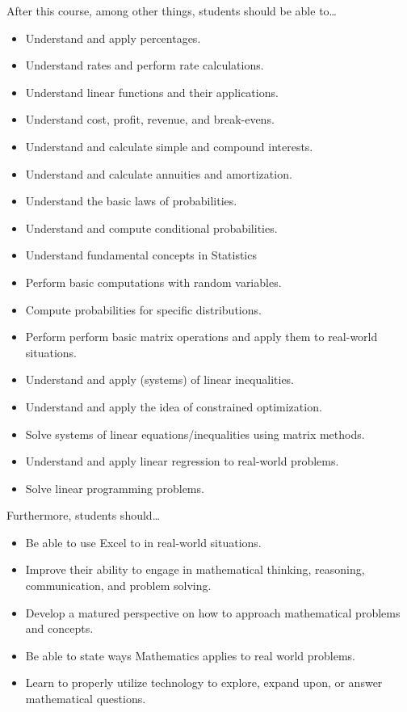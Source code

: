 \documentclass[11pt,letterpaper]{article}
\begin{document}
After this course, among other things, students should be able to\dots
	\begin{itemize} \itemsep=0.3ex
	\item Understand and apply percentages.
	\item Understand rates and perform rate calculations.
	\item Understand linear functions and their applications.
	\item Understand cost, profit, revenue, and break-evens. 
	\item Understand and calculate simple and compound interests.
	\item Understand and calculate annuities and amortization. 
	\item Understand the basic laws of probabilities. 
	\item Understand and compute conditional probabilities. 
	\item Understand fundamental concepts in Statistics
	\item Perform basic computations with random variables.  
	\item Compute probabilities for specific distributions.  
	\item Perform perform basic matrix operations and apply them to real-world situations.
	\item Understand and apply (systems) of linear inequalities. 
	\item Understand and apply the idea of constrained optimization. 	
	\item Solve systems of linear equations/inequalities using matrix methods.
	\item Understand and apply linear regression to real-world problems.
	\item Solve linear programming problems. 
	\end{itemize}
Furthermore, students should\dots
	\begin{itemize} \itemsep=0.3ex
	\item Be able to use Excel to in real-world situations. 
	\item  Improve their ability to engage in mathematical thinking, reasoning, communication, and problem solving.
	\item Develop a matured perspective on how to approach mathematical problems and concepts.
	\item Be able to state ways Mathematics applies to real world problems.
	\item Learn to properly utilize technology to explore, expand upon, or answer mathematical questions.
	\end{itemize}
\sectionbreak
\end{document}
